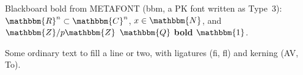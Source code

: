 \documentclass{article}
\begin{document}
Blackboard bold from METAFONT (bbm, a PK font written as Type~3):
$\mathbbm{R}^n \subset \mathbbm{C}^n$, $x \in \mathbbm{N}$, and
{\large $\mathbbm{Z}/p\mathbbm{Z}$} {\footnotesize $\mathbbm{Q}$} \textbf{bold $\mathbbm{1}$}.
\par Some ordinary text to fill a line or two, with ligatures (fi, fl) and kerning (AV, To).
\end{document}
